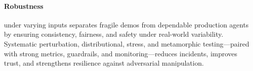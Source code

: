 \begin{TNtwocol}
\paragraph{Robustness}under varying inputs separates fragile demos from dependable production agents by ensuring consistency, fairness, and safety under real-world variability. Systematic perturbation, distributional, stress, and metamorphic testing---paired with strong metrics, guardrails, and monitoring---reduces incidents, improves trust, and strengthens resilience against adversarial manipulation.

\end{TNtwocol}